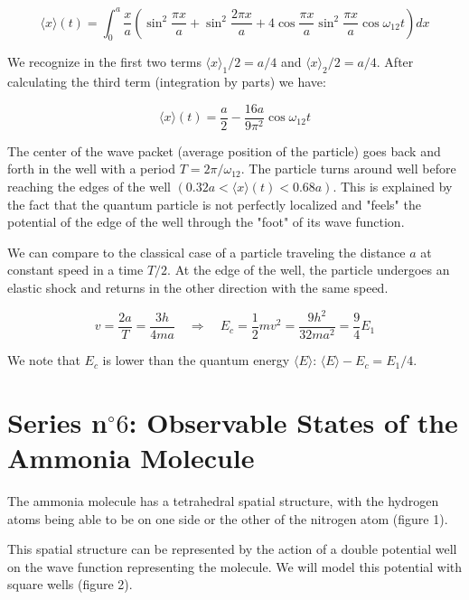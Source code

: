 \documentclass{article}
\begin{document}
\begin{enumerate}
{        $$
        \langle x \rangle(t) = \int_{0}^{a} \frac{x}{a} \left(\sin ^{2} \frac{\pi x}{a} + \sin ^{2} \frac{2 \pi x}{a} + 4 \cos \frac{\pi x}{a} \sin ^{2} \frac{\pi x}{a} \cos \omega_{12} t\right) dx
        $$

        We recognize in the first two terms $\langle x \rangle_{1} / 2 = a / 4$ and $\langle x \rangle_{2} / 2 = a / 4$. After calculating the third term (integration by parts) we have:

        $$
        \langle x \rangle(t) = \frac{a}{2} - \frac{16 a}{9 \pi^{2}} \cos \omega_{12} t
        $$

        The center of the wave packet (average position of the particle) goes back and forth in the well with a period $T = 2 \pi / \omega_{12}$. The particle turns around well before reaching the edges of the well $(0.32 a < \langle x \rangle(t) < 0.68 a)$. This is explained by the fact that the quantum particle is not perfectly localized and "feels" the potential of the edge of the well through the "foot" of its wave function.

        We can compare to the classical case of a particle traveling the distance $a$ at constant speed in a time $T / 2$. At the edge of the well, the particle undergoes an elastic shock and returns in the other direction with the same speed.

        $$
        v = \frac{2 a}{T} = \frac{3 h}{4 m a} \quad \Rightarrow \quad E_{c} = \frac{1}{2} m v^{2} = \frac{9 h^{2}}{32 m a^{2}} = \frac{9}{4} E_{1}
        $$

        We note that $E_{c}$ is lower than the quantum energy $\langle E \rangle$: $\langle E \rangle - E_{c} = E_{1} / 4$.}

    \end{enumerate}
\newpage
    \section*{Series n$^{\circ} 6$: Observable States of the Ammonia Molecule}

    The ammonia molecule has a tetrahedral spatial structure, with the hydrogen atoms being able to be on one side or the other of the nitrogen atom (figure 1).

    This spatial structure can be represented by the action of a double potential well on the wave function representing the molecule. We will model this potential with square wells (figure 2).
\end{document}
